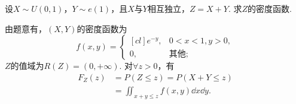 \begin{example}
设\(X \sim U(0,1)\)，\(Y \sim e(1)\)，且\(X\)与\(Y\)相互独立，\(Z = X+Y\).
求\(Z\)的密度函数.
\begin{solution}
由题意有，\((X,Y)\)的密度函数为\begin{equation*}
	f(x,y)
	= \begin{cases}[cl]
		e^{-y}, & 0<x<1,y>0, \\
		0, & \text{其他};
	\end{cases}
\end{equation*}
\(Z\)的值域为\(R(Z)=(0,+\infty)\).
对\(\forall z>0\)，有\begin{align*}
	F_Z(z) &= P(Z \leq z) = P(X+Y \leq z) \\
	&= \iint_{x+y \leq z} f(x,y) \dd{x}\dd{y}.
\end{align*}
\begin{figure}
	\centering
\end{figure}
\end{solution}
\end{example}
